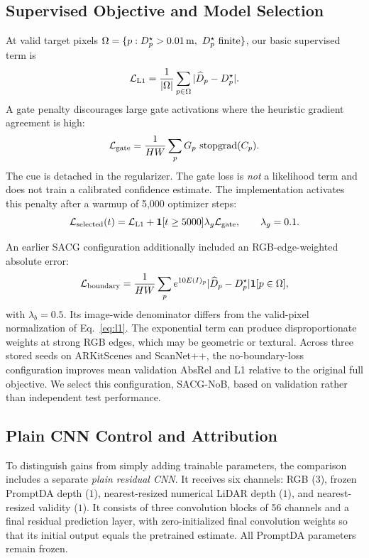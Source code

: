 \subsection{Supervised Objective and Model Selection}
At valid target pixels $\Omega=\{p:D^\star_p>0.01\,{\rm m},\ D^\star_p\ \text{finite}\}$, our basic supervised term is
\begin{equation}
\mathcal L_{\rm L1}=\frac{1}{|\Omega|}\sum_{p\in\Omega}|\widehat D_p-D^\star_p|.
\label{eq:l1}
\end{equation}
A gate penalty discourages large gate activations where the heuristic gradient agreement is high:
\begin{equation}
\mathcal L_{\rm gate}=\frac{1}{HW}\sum_p G_p\,\operatorname{stopgrad}(C_p).
\label{eq:lgate}
\end{equation}
The cue is detached in the regularizer. The gate loss is \emph{not} a likelihood term and does not train a calibrated confidence estimate. The implementation activates this penalty after a warmup of 5,000 optimizer steps:
\begin{equation}
\mathcal L_{\rm selected}(t)=\mathcal L_{\rm L1}
+\mathbf{1}[t\ge5000]\lambda_g\mathcal L_{\rm gate},
\qquad\lambda_g=0.1.
\label{eq:objective}
\end{equation}

An earlier SACG configuration additionally included an RGB-edge-weighted absolute error:
\begin{equation}
\mathcal L_{\rm boundary}
=\frac{1}{HW}\sum_p
e^{10E(I)_p}|\widehat D_p-D^\star_p|\mathbf{1}[p\in\Omega],
\label{eq:lboundary}
\end{equation}
with $\lambda_b=0.5$. Its image-wide denominator differs from the valid-pixel normalization of Eq.~\eqref{eq:l1}. The exponential term can produce disproportionate weights at strong RGB edges, which may be geometric or textural. Across three stored seeds on ARKitScenes and ScanNet++, the no-boundary-loss configuration improves mean validation AbsRel and L1 relative to the original full objective. We select this configuration, SACG-NoB, based on validation rather than independent test performance.

\subsection{Plain CNN Control and Attribution}
To distinguish gains from simply adding trainable parameters, the comparison includes a separate \emph{plain residual CNN}. It receives six channels: RGB ($3$), frozen PromptDA depth ($1$), nearest-resized numerical LiDAR depth ($1$), and nearest-resized validity ($1$). It consists of three convolution blocks of 56 channels and a final residual prediction layer, with zero-initialized final convolution weights so that its initial output equals the pretrained estimate. All PromptDA parameters remain frozen.

